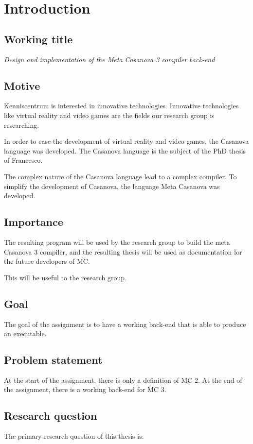 \section{Introduction}

\subsection{Working title}
\textit{Design and implementation of the Meta Casanova 3 compiler back-end}

\subsection{Motive}
Kenniscentrum is interested in innovative technologies.
Innovative technologies like virtual reality and video games are the fields our research group is researching.

In order to ease the development of virtual reality and video games, the Casanova language was developed.
The Casanova language is the subject of the PhD thesis of Francesco.

The complex nature of the Casanova language lead to a complex compiler.
To simplify the development of Casanova, the language Meta Casanova was developed.

\subsection{Importance}
The resulting program will be used by the research group to build the meta Casanova 3 compiler, and the resulting thesis will be used as documentation for the future developers of MC.

This will be useful to the research group.

\subsection{Goal}
The goal of the assignment is to have a working back-end that is able to produce an executable.

\subsection{Problem statement}
At the start of the assignment, there is only a definition of MC 2.
At the end of the assignment, there is a working back-end for MC 3.

\subsection{Research question}
The primary research question of this thesis is:

